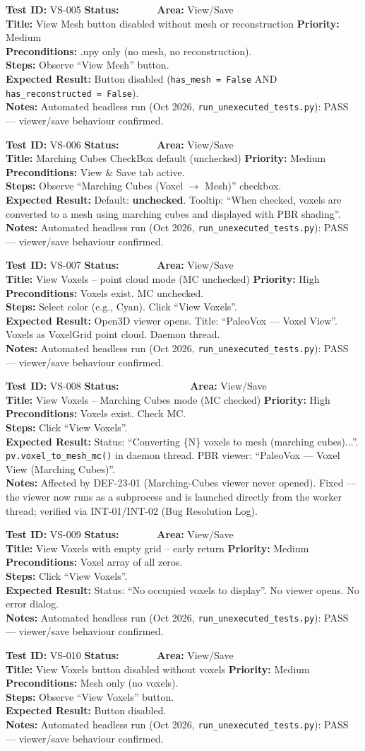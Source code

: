 \documentclass[12pt,a4paper]{article}
\newcommand{\statuspass}{\colorbox{statusgreen}{\textcolor{white}{\textbf{\,PASS\,}}}}
\newcommand{\statusresolved}{\colorbox{statusorange}{\textcolor{white}{\textbf{\,RESOLVED\,}}}}
\newcommand{\testcase}[9]{%
  \smallskip
  \noindent\textbf{Test ID:} #1 \hfill \textbf{Status:} #2 \hfill \textbf{Area:} #3 \\
  \textbf{Title:} #4 \hfill \textbf{Priority:} #5 \\[0.3em]
  \textbf{Preconditions:} #6 \\[0.3em]
  \textbf{Steps:} #7 \\[0.3em]
  \textbf{Expected Result:} #8 \\
  \textbf{Notes:} #9
  \smallskip
}
\begin{document}
\testcase{VS-005}{\statuspass}{View/Save}{View Mesh button disabled without mesh or reconstruction}{Medium}{.npy only (no mesh, no reconstruction).}{Observe ``View Mesh'' button.}{Button disabled (\texttt{has\_mesh = False} AND \texttt{has\_reconstructed = False}).}{Automated headless run (Oct 2026, \texttt{run\_unexecuted\_tests.py}): PASS --- viewer/save behaviour confirmed.}


\testcase{VS-006}{\statuspass}{View/Save}{Marching Cubes CheckBox default (unchecked)}{Medium}{View \& Save tab active.}{Observe ``Marching Cubes (Voxel $\rightarrow$ Mesh)'' checkbox.}{Default: \textbf{unchecked}. Tooltip: ``When checked, voxels are converted to a mesh using marching cubes and displayed with PBR shading''.}{Automated headless run (Oct 2026, \texttt{run\_unexecuted\_tests.py}): PASS --- viewer/save behaviour confirmed.}


\testcase{VS-007}{\statuspass}{View/Save}{View Voxels -- point cloud mode (MC unchecked)}{High}{Voxels exist. MC unchecked.}{Select color (e.g., Cyan). Click ``View Voxels''.}{Open3D viewer opens. Title: ``PaleoVox --- Voxel View''. Voxels as VoxelGrid point cloud. Daemon thread.}{Automated headless run (Oct 2026, \texttt{run\_unexecuted\_tests.py}): PASS --- viewer/save behaviour confirmed.}


\testcase{VS-008}{\statusresolved}{View/Save}{View Voxels -- Marching Cubes mode (MC checked)}{High}{Voxels exist. Check MC.}{Click ``View Voxels''.}{Status: ``Converting \{N\} voxels to mesh (marching cubes)...''. \texttt{pv.voxel\_to\_mesh\_mc()} in daemon thread. PBR viewer: ``PaleoVox --- Voxel View (Marching Cubes)''.}{Affected by DEF-23-01 (Marching-Cubes viewer never opened). Fixed --- the viewer now runs as a subprocess and is launched directly from the worker thread; verified via INT-01/INT-02 (Bug Resolution Log).}


\testcase{VS-009}{\statuspass}{View/Save}{View Voxels with empty grid -- early return}{Medium}{Voxel array of all zeros.}{Click ``View Voxels''.}{Status: ``No occupied voxels to display''. No viewer opens. No error dialog.}{Automated headless run (Oct 2026, \texttt{run\_unexecuted\_tests.py}): PASS --- viewer/save behaviour confirmed.}


\testcase{VS-010}{\statuspass}{View/Save}{View Voxels button disabled without voxels}{Medium}{Mesh only (no voxels).}{Observe ``View Voxels'' button.}{Button disabled.}{Automated headless run (Oct 2026, \texttt{run\_unexecuted\_tests.py}): PASS --- viewer/save behaviour confirmed.}
\end{document}
